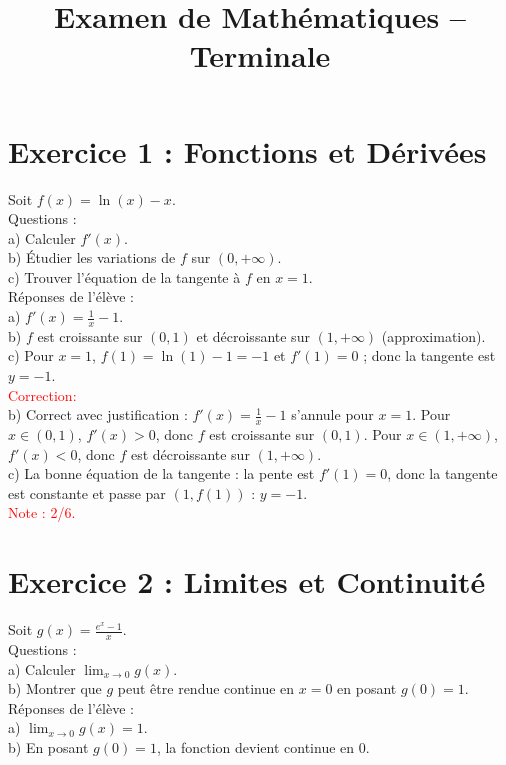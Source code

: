 \documentclass{article}
\begin{document}
\title{Examen de Mathématiques – Terminale}
\maketitle

\section*{Exercice 1 : Fonctions et Dérivées}
Soit $f(x) = \ln(x) - x$.\\
Questions :\\
a) Calculer $f'(x)$.\\
b) Étudier les variations de $f$ sur $(0,+\infty)$.\\
c) Trouver l’équation de la tangente à $f$ en $x = 1$.\\
Réponses de l’élève :\\
a) $f'(x) = \frac{1}{x} - 1$.\\
b) $f$ est croissante sur $(0,1)$ et décroissante sur $(1,+\infty)$ (approximation).\\
c) Pour $x = 1$, $f(1) = \ln(1) - 1 = -1$ et $f'(1) = 0$ ; donc la tangente est $y = -1$.\\

\textcolor{red}{Correction:}\\
b) Correct avec justification : $f'(x) = \frac{1}{x} - 1$ s'annule pour $x = 1$. Pour $x \in (0,1)$, $f'(x) > 0$, donc $f$ est croissante sur $(0,1)$. Pour $x \in (1,+\infty)$, $f'(x) < 0$, donc $f$ est décroissante sur $(1,+\infty)$.\\
c) La bonne équation de la tangente : la pente est $f'(1) = 0$, donc la tangente est constante et passe par $(1, f(1))$ : $y = -1$.\\

\textcolor{red}{Note : 2/6. }

\section*{Exercice 2 : Limites et Continuité}
Soit $g(x) = \frac{e^x - 1}{x}$.\\
Questions :\\
a) Calculer $\lim_{x \to 0} g(x)$.\\
b) Montrer que $g$ peut être rendue continue en $x = 0$ en posant $g(0) = 1$.\\
Réponses de l’élève :\\
a) $\lim_{x \to 0} g(x) = 1$.\\
b) En posant $g(0) = 1$, la fonction devient continue en $0$.\\
\end{document}
